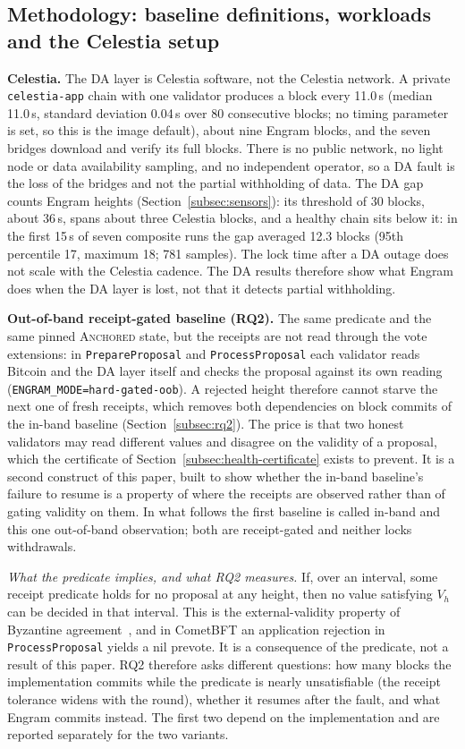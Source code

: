 \subsection*{Methodology: baseline definitions, workloads and the Celestia setup}

\textbf{Celestia.} The DA layer is Celestia software, not the Celestia network. A private
\texttt{celestia-app} chain with one validator produces a block every 11.0\,s (median
11.0\,s, standard deviation 0.04\,s over 80 consecutive blocks; no timing parameter is set,
so this is the image default), about nine Engram blocks, and the seven bridges download
and verify its full blocks. There is no public network, no light node or data availability
sampling, and no independent operator, so a DA fault is the loss of the bridges and not the
partial withholding of data. The DA gap counts Engram heights (Section~\ref{subsec:sensors}):
its threshold of 30 blocks, about 36\,s, spans about three Celestia blocks, and a healthy chain
sits below it: in the first 15\,s of seven composite runs the gap averaged 12.3 blocks (95th
percentile 17, maximum 18; 781 samples). The lock time after a DA outage does not scale with the
Celestia cadence. The DA results therefore show
what Engram does when the DA layer is lost, not that it detects partial withholding.

\textbf{Out-of-band receipt-gated baseline (RQ2).} The same predicate and the
same pinned \textsc{Anchored} state, but the receipts are not read through the
vote extensions: in \texttt{PrepareProposal} and \texttt{ProcessProposal} each
validator reads Bitcoin and the DA layer itself and checks the proposal against
its own reading (\texttt{ENGRAM\_MODE=hard-gated-oob}). A rejected height
therefore cannot starve the next one of fresh receipts, which removes both
dependencies on block commits of the in-band baseline (Section~\ref{subsec:rq2}). The price
is that two honest validators may read different values and disagree on the
validity of a proposal, which the certificate of
Section~\ref{subsec:health-certificate} exists to prevent. It is a second
construct of this paper, built to show whether the in-band baseline's failure to
resume is a property of where the receipts are observed rather than of gating
validity on them. In what follows the first baseline is called in-band and this
one out-of-band observation; both are receipt-gated and neither locks
withdrawals.

\emph{What the predicate implies, and what RQ2 measures.} If, over an interval,
some receipt predicate holds for no proposal at any height, then no value
satisfying $V_h$ can be decided in that interval. This is the external-validity
property of Byzantine agreement~\cite{cachin2001secure}, and in CometBFT an
application rejection in \texttt{ProcessProposal} yields a nil prevote. It is a
consequence of the predicate, not a result of this paper. RQ2 therefore asks
different questions: how many blocks the implementation commits while the
predicate is nearly unsatisfiable (the receipt tolerance widens with the round),
whether it resumes after the fault, and what Engram commits instead. The
first two depend on the implementation and are reported separately for the two
variants.

